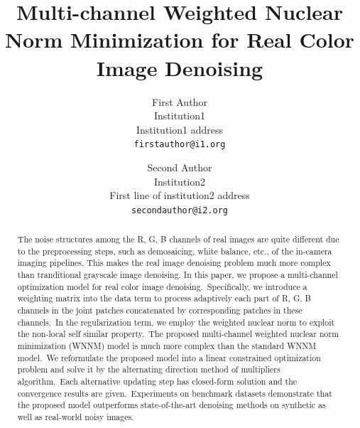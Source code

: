 \documentclass[10pt,twocolumn,letterpaper,sort&compress]{article}
\begin{document}
\title{Multi-channel Weighted Nuclear Norm Minimization for Real Color Image Denoising}

\author{First Author\\
Institution1\\
Institution1 address\\
{\tt\small firstauthor@i1.org}
\and
Second Author\\
Institution2\\
First line of institution2 address\\
{\tt\small secondauthor@i2.org}
}

\maketitle

\begin{abstract}
The noise structures among the R, G, B channels of real images are quite different due to the preprocessing steps, such as demosaicing, white balance, etc., of the in-camera imaging pipelines. This makes the real image denoising problem much more complex than tranditional grayscale image denoising. In this paper, we propose a multi-channel optimization model for real color image denoising.\ Specifically, we introduce a weighting matrix into the data term to process adaptively each part of R, G, B channels in the joint patches concatenated by corresponding patches in these channels.\ In the regularization term, we employ the weighted nuclear norm to exploit the non-local self similar property.\ The proposed multi-channel weighted nuclear norm minimization (WNNM) model is much more complex than the standard WNNM model.\ We reformulate the proposed model into a linear constrained optimization problem and solve it by the alternating direction method of multipliers algorithm.\ Each alternative updating step has closed-form solution and the convergence results are given.\ Experiments on benchmark datasets demonstrate that the proposed model outperforms state-of-the-art denoising methods on synthetic as well as real-world noisy images.
\end{abstract}
\end{document}
